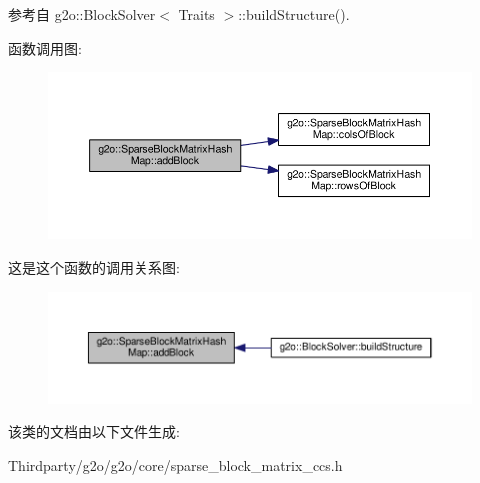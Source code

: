 参考自 g2o\-::\-Block\-Solver$<$ Traits $>$\-::build\-Structure().



函数调用图\-:
\nopagebreak
\begin{figure}[H]
\begin{center}
\leavevmode
\includegraphics[width=350pt]{classg2o_1_1SparseBlockMatrixHashMap_a08330c47b1b60bbe008e3c4ee2f5150f_cgraph}
\end{center}
\end{figure}




这是这个函数的调用关系图\-:
\nopagebreak
\begin{figure}[H]
\begin{center}
\leavevmode
\includegraphics[width=350pt]{classg2o_1_1SparseBlockMatrixHashMap_a08330c47b1b60bbe008e3c4ee2f5150f_icgraph}
\end{center}
\end{figure}




该类的文档由以下文件生成\-:\begin{DoxyCompactItemize}
\item 
Thirdparty/g2o/g2o/core/sparse\-\_\-block\-\_\-matrix\-\_\-ccs.\-h\end{DoxyCompactItemize}
